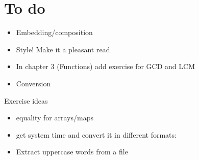 \section{To do}

\begin{itemize}
Run gotest -test.bench=Bench -test.cpuprofile=cpuprof

    \$(GC) y.go
    \$(LD) -o units y.\$O

This will generate a cpu profile. You can examine it with gopprof:

gopprof 8.out cpuprof

http://blog.golang.org/2011/06/profiling-go-programs.html

- Evan

\item
Embedding/composition
\item
Style! Make it a pleasant read
\item
In chapter 3 (Functions) add exercise for GCD and LCM
\item
Conversion 
\end{itemize}
Exercise ideas
\begin{itemize}
\item
equality for arrays/maps
\item
get system time and convert it in different formats:
\item
Extract uppercase words from a file
\end{itemize}
